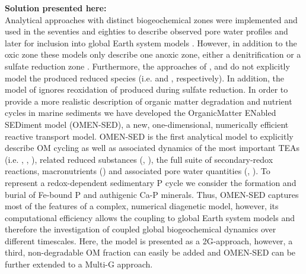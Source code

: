 \documentclass[gmd, manuscript]{copernicus}
\begin{document}
\textbf{Solution presented here:}\\
Analytical approaches with distinct biogeochemical zones were implemented and used in the seventies and eighties to describe observed pore water profiles 
\citep[e.g.][]{vanderborght_vertical_1975, vanderborght_kinetic_1977, billen1982idealized, goloway_diagenetic_1982} and later for inclusion into global Earth system models \citep{tromp_global_1995}. 
However, in addition to the oxic zone these models only describe one anoxic zone, either a denitrification \citep{vanderborght_vertical_1975, vanderborght_kinetic_1977, billen1982idealized, goloway_diagenetic_1982} 
or a sulfate reduction zone \citep{tromp_global_1995}. 
Furthermore, the approaches of \citet{vanderborght_vertical_1975}, \citet{goloway_diagenetic_1982} and \citet{tromp_global_1995} do not explicitly model the produced reduced 
species (i.e.  and , respectively). In addition, the model of \citet{tromp_global_1995} ignores reoxidation of  produced during sulfate reduction. 
In order to provide a more realistic description of organic matter degradation and nutrient cycles in marine sediments we have developed the OrganicMatter ENabled SEDiment model (OMEN-SED), 
a new, one-dimensional, numerically efficient reactive transport model. OMEN-SED is the first analytical model to explicitly describe OM cycling as well as associated dynamics of the most important TEAs 
(i.e. , , ), related reduced substances (, ), the full suite of secondary-redox reactions, macronutrients () and associated pore water quantities (, ). 
To represent a redox-dependent sedimentary P cycle we consider the formation and burial of Fe-bound P and authigenic Ca-P minerals. %
Thus, OMEN-SED captures most of the features of a complex, numerical diagenetic model, however, its computational efficiency allows the coupling to global Earth system models and therefore the investigation of coupled global biogeochemical 
dynamics over different timescales. 
Here, the model is presented as a 2G-approach, however, a third, non-degradable OM fraction can easily be added and OMEN-SED can be further extended to a Multi-G approach. 
\end{document}
